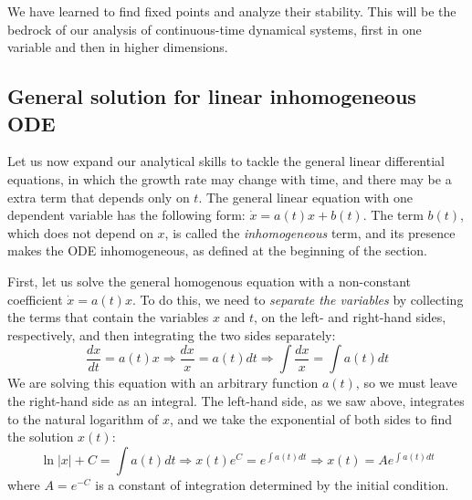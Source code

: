 \documentclass[11pt]{book}
\begin{document}
We have learned to find fixed points and analyze their stability. This will be the bedrock of our analysis of continuous-time dynamical systems, first in one variable and then in higher dimensions.
\subsection{General solution for linear inhomogeneous ODE}


Let us now expand our analytical skills to tackle the general linear differential equations, in which the growth rate may change with time, and there may be a extra term that depends only on $t$. The general linear equation with one dependent variable has the following form: $ \dot x = a(t)x + b(t)$. The term $b(t)$, which does not depend on $x$, is called the \emph{inhomogeneous} term, and its presence makes the ODE inhomogeneous, as defined at the beginning of the section.

First, let us solve the general homogenous equation with a non-constant coefficient $\dot x = a(t) x$. To do this, we need to \emph{separate the variables}  by collecting the terms that contain the variables $x$ and $t$, on the left- and right-hand sides,  respectively, and then integrating the two sides separately:
$$ \frac{d x} {dt} = a(t) x \Rightarrow \frac{dx}{x} = a(t) dt \Rightarrow \int \frac{dx}{x} = \int a(t) dt $$
We are solving this equation with an arbitrary function $a(t)$, so we must leave the right-hand side as an integral. The left-hand side, as we saw above, integrates to the natural logarithm of $x$, and we take the exponential of both sides to find the solution $x(t)$:
$$ \ln |x| + C = \int a(t) dt \Rightarrow x(t) e^C = e^{\int a(t) dt} \Rightarrow x(t) = A e^{\int a(t) dt} $$
where $A = e^{-C}$  is a constant of integration determined by the initial condition.
\end{document}

